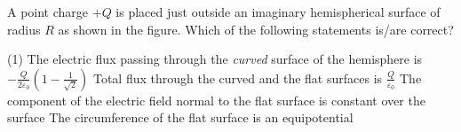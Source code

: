

    \item A point charge \( +Q \) is placed just outside an imaginary hemispherical surface of radius \( R \) as shown in the figure. Which of the following statements is/are correct?
        \begin{tasks}(1)
            \task The electric flux passing through the \textit{curved} surface of the hemisphere is \(- \frac{Q}{2\varepsilon_0} \left( 1 - \frac{1}{\sqrt{2}} \right)\)
            \task Total flux through the curved and the flat surfaces is \(\frac{Q}{\varepsilon_0}\)
            \task The component of the electric field normal to the flat surface is constant over the surface
            \task The circumference of the flat surface is an equipotential
        \end{tasks}


\begin{center}
\end{center}
